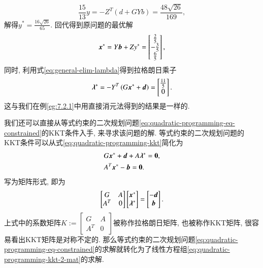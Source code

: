 \begin{eg}
\begin{equation*}
\frac{15}{13} y = - Z^T \left( d + G Y b \right) = \frac{48 \sqrt{26}}{169},
\end{equation*}
解得$y^* = \frac{16 \sqrt{26}}{65}.$ 回代得到原问题的最优解
\begin{equation*}
{\bm{x}}^* = Y {\bm{b}} + Z y^* = \left[\begin{matrix} \frac{2}{5} \\ - \frac{3}{5} \\ \frac{6}{5} \end{matrix}\right],
\end{equation*}
同时, 利用式\eqref{eq:general-elim-lambda}得到拉格朗日乘子
\begin{equation*}
{\bm{\lambda}}^* = - Y^T \left( G {\bm{x}}^* + {\bm{d}} \right) = \left[\begin{matrix} \frac{11}{5} \\ 0 \end{matrix}\right].
\end{equation*}
这与我们在例\eqref{eg:7.2.1}中用直接消元法得到的结果是一样的.
\end{eg}

我们还可以直接从等式约束的二次规划问题\eqref{eq:quadratic-programming-eq-constrained}的KKT条件入手, 来寻求该问题的解. 等式约束的二次规划问题的KKT条件可以从式\eqref{eq:quadratic-programming-kkt}简化为
\begin{equation}
\label{eq:quadratic-programming-kkt-2}
\begin{aligned}
& G {\bm{x}}^* + {\bm{d}} + A {\bm{\lambda}}^* = {\bm{0}}, \\
& A^T {\bm{x}}^* - {\bm{b}} = {\bm{0}}.
\end{aligned}
\end{equation}
写为矩阵形式, 即为
\begin{equation}
\label{eq:quadratic-programming-kkt-2-mat}
\begin{bmatrix} G & A \\ A^T & 0 \end{bmatrix} \begin{bmatrix} {\bm{x}}^* \\ {\bm{\lambda}}^* \end{bmatrix} = \begin{bmatrix} -{\bm{d}} \\ {\bm{b}} \end{bmatrix}.
\end{equation}
上式中的系数矩阵$K := \begin{bmatrix} G & A \\ A^T & 0 \end{bmatrix}$被称作拉格朗日矩阵, 也被称作KKT矩阵, 很容易看出KKT矩阵是对称不定的. 那么等式约束的二次规划问题\eqref{eq:quadratic-programming-eq-constrained}的求解就转化为了线性方程组\eqref{eq:quadratic-programming-kkt-2-mat}的求解.

